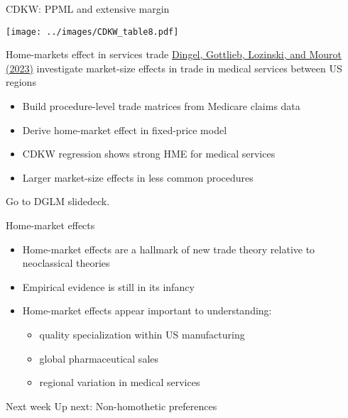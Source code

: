 \documentclass[11pt,notes=hide,aspectratio=169]{beamer}
\begin{document}
\begin{frame}{CDKW: PPML and extensive margin}
\begin{center}\texttt{[image: ../images/CDKW\_table8.pdf]}\end{center}
\end{frame}
\begin{frame}{Home-markets effect in services trade}
\href{http://www.jdingel.com/research/DGLM_MSTMS.pdf}{Dingel, Gottlieb, Lozinski, and Mourot (2023)}
investigate market-size effects in trade in medical services between US regions
\begin{itemize}
\item Build procedure-level trade matrices from Medicare claims data
\item Derive home-market effect in fixed-price model
\item CDKW regression shows strong HME for medical services
\item Larger market-size effects in less common procedures
\end{itemize}
Go to DGLM slidedeck.
\end{frame}
\begin{frame}{Home-market effects}
\begin{itemize}
	\item Home-market effects are a hallmark of new trade theory relative to neoclassical theories
	\item Empirical evidence is still in its infancy
	\item Home-market effects appear important to understanding:
	\begin{itemize}
		\item quality specialization within US manufacturing
		\item global pharmaceutical sales
		\item regional variation in medical services
	\end{itemize}
\end{itemize}
\end{frame}
\begin{frame}{Next week}
Up next: Non-homothetic preferences
\end{frame}
\end{document}
